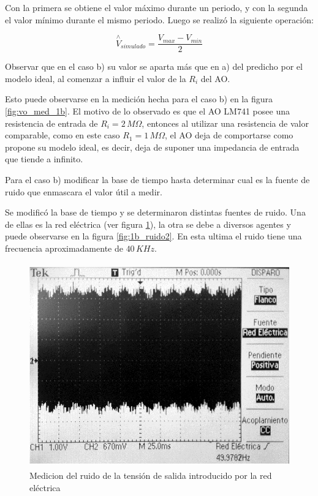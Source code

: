\documentclass[10pt,spanish,a4paper,openany,notitlepage]{article}
\begin{document}
\begin{enumerate}
\begin{enumerate}
    Con la primera se obtiene el valor máximo durante un periodo, y con la segunda el valor
    mínimo durante el mismo periodo. Luego se realizó la siguiente operación:
    
        
        
    \[ \displaystyle \overset{\wedge}{V}_{simulado} = \frac{V_{max}-V_{min}}{2} \]
        
    
    \end{enumerate}

{\color{OliveGreen}
Observar que en el caso b) su valor se aparta más que en a) del predicho por el modelo ideal, al comenzar a influir el valor de la ${R}_{i}$ del AO.}

Esto puede observarse en la medición hecha para el caso b) en la figura \ref{fig:vo_med_1b}. El motivo de lo observado es que el AO LM741 posee una resistencia de entrada de $R_i = 2\,\unit{M\Omega}$, entonces al utilizar una resistencia de valor comparable, como en este caso $R_1 = 1\,\unit{M\Omega}$, el AO deja de comportarse como propone su modelo ideal, es decir, deja de suponer una impedancia de entrada que tiende a infinito.

{\color{OliveGreen}
Para el caso b) modificar la base de tiempo hasta determinar cual es la fuente de ruido que enmascara el valor útil a medir.}

Se modificó la base de tiempo y se determinaron distintas fuentes de ruido. Una de ellas es
la red eléctrica (ver figura \ref{fig:1b_ruido}), la otra se debe a diversos agentes y puede
observarse en la figura \ref{fig:1b_ruido2}. En esta ultima el ruido tiene una frecuencia aproximadamente de  $40\,\unit{KHz}$. \\

\begin{figure}[H]
    \centering
    \includegraphics[width=350pt, height=250pt]{mediciones/A1b-ruido.jpg}
    \caption{Medicion del ruido de la tensión de salida introducido por la red eléctrica}
    \label{fig:1b_ruido}
    \end{figure}
    

\end{enumerate}
\end{document}
